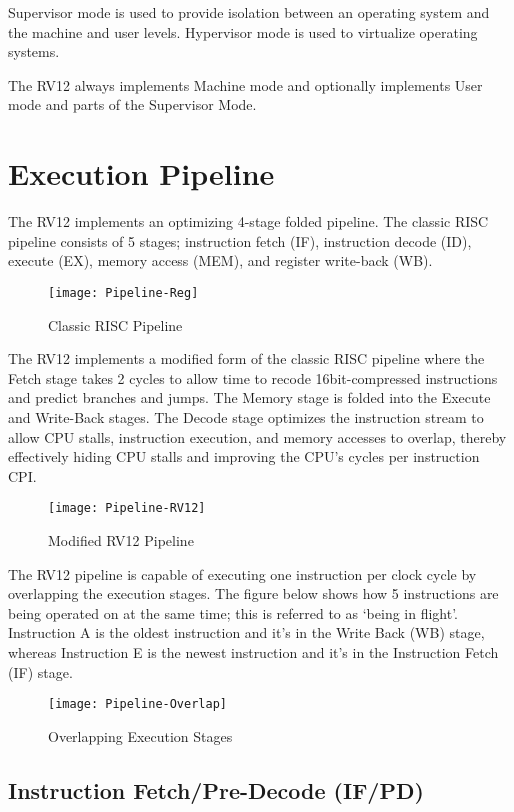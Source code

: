 Supervisor mode is used to provide isolation between an operating system and the machine and user levels. Hypervisor mode is used to virtualize operating systems.

The RV12 always implements Machine mode and optionally implements User mode and parts of the Supervisor Mode.

\section{Execution Pipeline}\label{execution-pipeline}

The RV12 implements an optimizing 4-stage folded pipeline. The classic RISC pipeline consists of 5 stages; instruction fetch (IF), instruction decode (ID), execute (EX), memory access (MEM), and register write-back (WB).

\begin{figure}[hbt]
  \texttt{[image: Pipeline-Reg]}
  \caption{Classic RISC Pipeline}
\end{figure}

The RV12 implements a modified form of the classic RISC pipeline where the
Fetch stage takes 2 cycles to allow time to recode 16bit-compressed
instructions and predict branches and jumps. The Memory stage is folded
into the Execute and Write-Back stages. The Decode stage optimizes the
instruction stream to allow CPU stalls, instruction execution, and
memory accesses to overlap, thereby effectively hiding CPU stalls and
improving the CPU's cycles per instruction CPI.

\begin{figure}[hbt]
  \texttt{[image: Pipeline-RV12]}
  \caption{Modified RV12 Pipeline}
\end{figure}

The RV12 pipeline is capable of executing one instruction per clock
cycle by overlapping the execution stages. The figure below shows how 5
instructions are being operated on at the same time; this is referred to
as `being in flight'. Instruction A is the oldest instruction and it's
in the Write Back (WB) stage, whereas Instruction E is the
newest instruction and it's in the Instruction Fetch (IF) stage.

\begin{figure}[hbt]
  \texttt{[image: Pipeline-Overlap]}
  \caption{Overlapping Execution Stages}
\end{figure}

\subsection{Instruction Fetch/Pre-Decode
(IF/PD)}\label{instruction-fetchpre-decode-ifpd}

